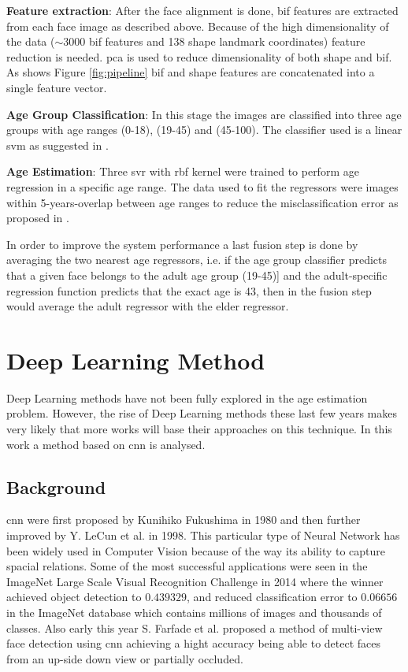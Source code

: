 \textbf{Feature extraction}: 
After the face alignment is done, \gls{bif} features are extracted from each face image as described above. Because of the high dimensionality of the data ($\sim3000$ \gls{bif} features and 138 shape landmark coordinates) feature reduction is needed. \gls{pca} is used to reduce dimensionality of both shape and \gls{bif}. As shows Figure \ref{fig:pipeline} \gls{bif} and shape features are concatenated into a single feature vector.

\textbf{Age Group Classification}:
In this stage the images are classified into three age groups with age ranges (0-18), (19-45) and (45-100). The classifier used is a linear \gls{svm} as suggested in \cite{4531189}.

\textbf{Age Estimation}:
Three \gls{svr} with \gls{rbf} kernel were trained to perform age regression in a specific age range. The data used to fit the regressors were images within 5-years-overlap between age ranges to reduce the misclassification error as proposed in \cite{han:age}. 

In order to improve the system performance a last fusion step is done by averaging the two nearest age regressors, i.e. if the age group classifier predicts that a given face belongs to the adult age group (19-45)] and the adult-specific regression function predicts that the exact age is 43, then in the fusion step would average the adult regressor with the elder regressor.


\section{Deep Learning Method}\label{sec:deep}

Deep Learning methods have not been fully explored in the age estimation problem. However, the rise of Deep Learning methods these last few years makes very likely that more works will base their approaches on this technique. In this work a method based on \gls{cnn} is analysed.

\subsection{Background}
\gls{cnn} were first proposed by Kunihiko Fukushima \cite{fukushima:neocognitronbc} in 1980 and then further improved by Y. LeCun et al. \cite{Lecun98gradient-basedlearning} in 1998. This particular type of Neural Network has been widely used in Computer Vision because of the way its ability to capture spacial relations. Some of the most successful applications were seen in the ImageNet Large Scale Visual Recognition Challenge \cite{DBLP:journals/corr/RussakovskyDSKSMHKKBBF14} in 2014 where the winner \cite{DBLP:journals/corr/SzegedyLJSRAEVR14} achieved object detection to $0.439329$, and reduced classification error to $0.06656$ in the ImageNet database which contains millions of images and thousands of classes. Also early this year S. Farfade et al. \cite{DBLP:journals/corr/FarfadeSL15} proposed a method of multi-view face detection using \gls{cnn} achieving a hight accuracy being able to detect faces from an up-side down view or partially occluded.

